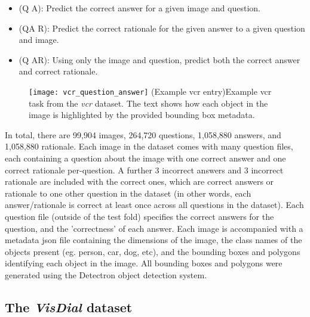 \begin{itemize}\label{list:vcr_task_types}
    \item (Q \rightarrow A): Predict the correct answer for a given image and question.
    \item (QA \rightarrow R): Predict the correct rationale for the given answer to a given question and image.
    \item (Q \rightarrow AR): Using only the image and question, predict both the correct answer and correct rationale.
\end{itemize}

\begin{figure}[htbp]
    \centering
    \texttt{[image: vcr\_question\_answer]}
    \captionsource(Example \acrshort{vcr} entry){Example \acrshort{vcr} task from the \textit{\acrshort{vcr}} dataset. The text shows how each object in the image is highlighted by the provided bounding box metadata. \label{fig:vcr_question_answer}}{\citeauthor{zellers_recognition_2019}\cite{zellers_recognition_2019}}
\end{figure}

In total, there are 99,904 images, 264,720 questions, 1,058,880 answers, and 1,058,880 rationale.
Each image in the dataset comes with many question files, each containing a question about the image with one correct answer and one correct rationale per-question.
A further 3 incorrect answers and 3 incorrect rationale are included with the correct ones, which are correct answers or rationale to one other question in the dataset (in other words, each answer/rationale is correct at least once across all questions in the dataset).
Each question file (outside of the test fold) specifies the correct answers for the question, and the 'correctness' of each answer.
Each image is accompanied with a metadata json file containing the dimensions of the image, the class names of the objects present (eg. person, car, dog, etc), and the bounding boxes and polygons identifying each object in the image.
All bounding boxes and polygons were generated using the Detectron object detection system\cite{Detectron2018}.

\subsection{The \textit{VisDial} dataset}
\label{subsec:visdial_dataset}

